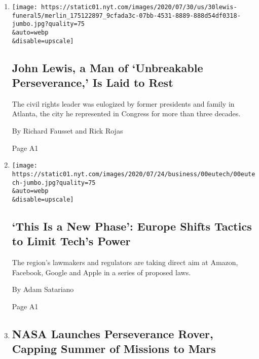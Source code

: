 \begin{enumerate}
\def\labelenumi{\arabic{enumi}.}
\item
  \href{/2020/07/30/us/john-lewis-live-funeral.html}{}

  \texttt{[image: https://static01.nyt.com/images/2020/07/30/us/30lewis-funeral5/merlin\_175122897\_9cfada3c-07bb-4531-8889-888d54df0318-jumbo.jpg?quality=75\\\&auto=webp\\\&disable=upscale]}

  \hypertarget{john-lewis-a-man-of-unbreakable-perseverance-is-laid-to-rest}{%
  \subsection{John Lewis, a Man of `Unbreakable Perseverance,' Is Laid
  to
  Rest}\label{john-lewis-a-man-of-unbreakable-perseverance-is-laid-to-rest}}

  The civil rights leader was eulogized by former presidents and family
  in Atlanta, the city he represented in Congress for more than three
  decades.

  By Richard Fausset and Rick Rojas

  Page A1
\item
  \href{/2020/07/30/technology/europe-new-phase-tech-amazon-apple-facebook-google.html}{}

  \texttt{[image: https://static01.nyt.com/images/2020/07/24/business/00eutech/00eutech-jumbo.jpg?quality=75\\\&auto=webp\\\&disable=upscale]}

  \hypertarget{this-is-a-new-phase-europe-shifts-tactics-to-limit-techs-power}{%
  \subsection{`This Is a New Phase': Europe Shifts Tactics to Limit
  Tech's
  Power}\label{this-is-a-new-phase-europe-shifts-tactics-to-limit-techs-power}}

  The region's lawmakers and regulators are taking direct aim at Amazon,
  Facebook, Google and Apple in a series of proposed laws.

  By Adam Satariano

  Page A1
\item
  \href{/2020/07/30/science/nasa-mars-launch.html}{}

  \hypertarget{nasa-launches-perseverance-rover-capping-summer-of-missions-to-mars}{%
  \subsection{NASA Launches Perseverance Rover, Capping Summer of
  Missions to
  Mars}\label{nasa-launches-perseverance-rover-capping-summer-of-missions-to-mars}}


\end{enumerate}
